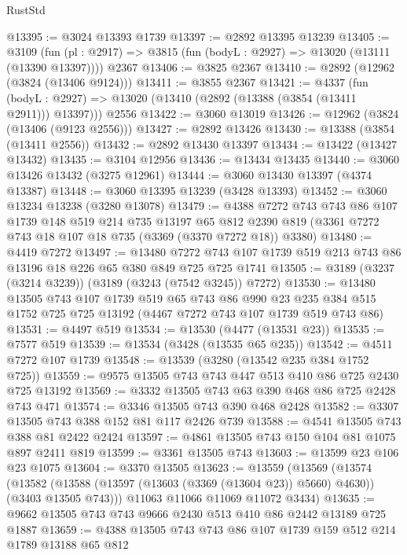 \begin{lexlean}{RustStd}
\begin{coremodule}
@13395 := @3024 @13393 @1739
@13397 := @2892 @13395 @13239
@13405 := @3109
    (fun (pl : @2917) => @3815 (fun (bodyL : @2927) => @13020 (@13111 (@13390 @13397))))
    @2367
@13406 := @3825 @2367
@13410 := @2892 (@12962 (@3824 (@13406 @9124)))
@13411 := @3855 @2367
@13421 := @4337
    (fun (bodyL : @2927) => @13020 (@13410 (@2892 (@13388 (@3854 (@13411 @2911))) @13397)))
    @2556
@13422 := @3060 @13019
@13426 := @12962 (@3824 (@13406 (@9123 @2556)))
@13427 := @2892 @13426
@13430 := @13388 (@3854 (@13411 @2556))
@13432 := @2892 @13430 @13397
@13434 := @13422 (@13427 @13432)
@13435 := @3104 @12956
@13436 := @13434 @13435
@13440 := @3060 @13426 @13432 (@3275 @12961)
@13444 := @3060 @13430 @13397 (@4374 @13387)
@13448 := @3060 @13395 @13239 (@3428 @13393)
@13452 := @3060 @13234 @13238 (@3280 @13078)
@13479 := @4388
    @7272
    @743
    @743
    @86
    @107
    @1739
    @148
    @519
    @214
    @735
    @13197
    @65
    @812
    @2390
    @819
    (@3361 @7272 @743 @18 @107 @18 @735 (@3369 (@3370 @7272 @18)) @3380)
@13480 := @4419 @7272
@13497 := @13480
    @7272
    @743
    @107
    @1739
    @519
    @213
    @743
    @86
    @13196
    @18
    @226
    @65
    @380
    @849
    @725
    @725
    @1741
@13505 := @3189 (@3237 (@3214 @3239)) (@3189 (@3243 (@7542 @3245)) @7272)
@13530 := @13480
    @13505
    @743
    @107
    @1739
    @519
    @65
    @743
    @86
    @990
    @23
    @235
    @384
    @515
    @1752
    @725
    @725
    @13192
    (@4467 @7272 @743 @107 @1739 @519 @743 @86)
@13531 := @4497 @519
@13534 := @13530 (@4477 (@13531 @23))
@13535 := @7577 @519
@13539 := @13534 (@3428 (@13535 @65 @235))
@13542 := @4511 @7272 @107 @1739
@13548 := @13539 (@3280 (@13542 @235 @384 @1752 @725))
@13559 := @9575 @13505 @743 @743 @447 @513 @410 @86 @725 @2430 @725 @13192
@13569 := @3332 @13505 @743 @63 @390 @468 @86 @725 @2428 @743 @471
@13574 := @3346 @13505 @743 @390 @468 @2428
@13582 := @3307 @13505 @743 @388 @152 @81 @117 @2426 @739
@13588 := @4541 @13505 @743 @388 @81 @2422 @2424
@13597 := @4861 @13505 @743 @150 @104 @81 @1075 @897 @2411 @819
@13599 := @3361 @13505 @743
@13603 := @13599 @23 @106 @23 @1075
@13604 := @3370 @13505
@13623 := @13559
    (@13569
      (@13574
        (@13582 (@13588 (@13597 (@13603 (@3369 (@13604 @23)) @5660) @4630)) (@3403 @13505 @743)))
      @11063
      @11066
      @11069
      @11072
      @3434)
@13635 := @9662 @13505 @743 @743 @9666 @2430 @513 @410 @86 @2442 @13189 @725 @1887
@13659 := @4388
    @13505
    @743
    @743
    @86
    @107
    @1739
    @159
    @512
    @214
    @1789
    @13188
    @65
    @812

\end{coremodule}
\end{lexlean}
